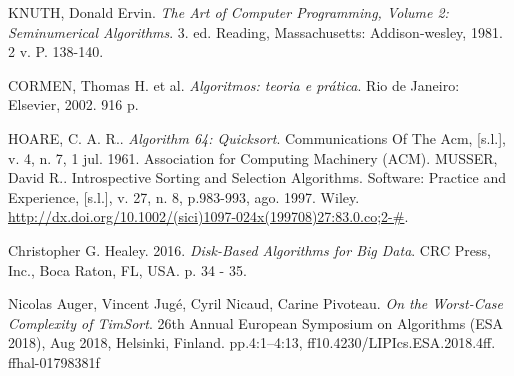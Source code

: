 \documentclass[a4paper,12pt]{scrartcl}
\begin{document}
\begin{thebibliography}{9}

KNUTH, Donald Ervin. \textit{The Art of Computer Programming, Volume 2: Seminumerical Algorithms}. 3. ed. Reading, Massachusetts: Addison-wesley, 1981. 2 v. P. 138-140.

CORMEN, Thomas H. et al. \textit{Algoritmos: teoria e prática}. Rio de Janeiro: Elsevier, 2002. 916 p.

HOARE, C. A. R.. \textit{Algorithm 64: Quicksort}. Communications Of The Acm, [s.l.], v. 4, n. 7, 1 jul. 1961. Association for Computing Machinery (ACM). \href{http://dx.doi.org/10.1145/366622.366644.}

MUSSER, David R.. Introspective Sorting and Selection Algorithms. Software: Practice and Experience, [s.l.], v. 27, n. 8, p.983-993, ago. 1997. Wiley. \url{http://dx.doi.org/10.1002/(sici)1097-024x(199708)27:83.0.co;2-#}.

Christopher G. Healey. 2016. \textit{Disk-Based Algorithms for Big Data}. CRC Press, Inc., Boca Raton, FL, USA. p. 34 - 35.

Nicolas Auger, Vincent Jugé, Cyril Nicaud, Carine Pivoteau. \textit{On the Worst-Case Complexity of TimSort}. 26th Annual European Symposium on Algorithms (ESA 2018), Aug 2018, Helsinki, Finland. pp.4:1–4:13, ff10.4230/LIPIcs.ESA.2018.4ff. ffhal-01798381f
\end{thebibliography}
\end{document}
